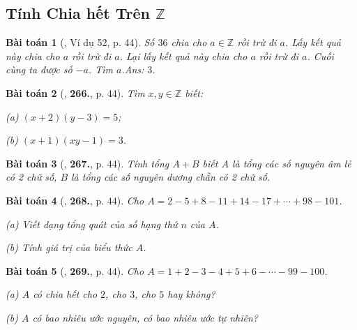 \documentclass{article}
\numberwithin{equation}{section}
\newtheorem{baitoan}{Bài toán}
\begin{document}

\subsection{Tính Chia hết Trên $\mathbb{Z}$}

\begin{baitoan}[\cite{Binh_Toan_6_tap_1}, Ví dụ 52, p. 44]
	Số $36$ chia cho $a\in\mathbb{Z}$ rồi trừ đi $a$. Lấy kết quả này chia cho $a$ rồi trừ đi $a$. Lại lấy kết quả này chia cho $a$ rồi trừ đi $a$. Cuối cùng ta được số $-a$. Tìm $a$.\hfill\textsf{Ans:} $3$.
\end{baitoan}

\begin{baitoan}[\cite{Binh_Toan_6_tap_1}, \textbf{266.}, p. 44]
	Tìm $x,y\in\mathbb{Z}$ biết:
	\begin{enumerate*}
		\item[(a)] $(x + 2)(y - 3) = 5$;
		\item[(b)] $(x + 1)(xy - 1) = 3$.
	\end{enumerate*}
\end{baitoan}

\begin{baitoan}[\cite{Binh_Toan_6_tap_1}, \textbf{267.}, p. 44]
	Tính tổng $A + B$ biết $A$ là tổng các số nguyên âm lẻ có 2 chữ số, $B$ là tổng các số nguyên dương chẵn có 2 chữ số.
\end{baitoan}

\begin{baitoan}[\cite{Binh_Toan_6_tap_1}, \textbf{268.}, p. 44]
	Cho $A = 2 - 5 + 8 - 11 + 14 - 17 + \cdots + 98 - 101$.
	\begin{enumerate*}
		\item[(a)] Viết dạng tổng quát của số hạng thứ $n$ của $A$.
		\item[(b)] Tính giá trị của biểu thức $A$.
	\end{enumerate*}
\end{baitoan}

\begin{baitoan}[\cite{Binh_Toan_6_tap_1}, \textbf{269.}, p. 44]
	Cho $A = 1 + 2 - 3 - 4 + 5 + 6 - \cdots - 99 - 100$.
	\begin{enumerate*}
		\item[(a)] $A$ có chia hết cho $2$, cho $3$, cho $5$ hay không?
		\item[(b)] $A$ có bao nhiêu ước nguyên, có bao nhiêu ước tự nhiên?
	\end{enumerate*}
\end{baitoan}


\printbibliography[heading=bibintoc]
	
\end{document}

